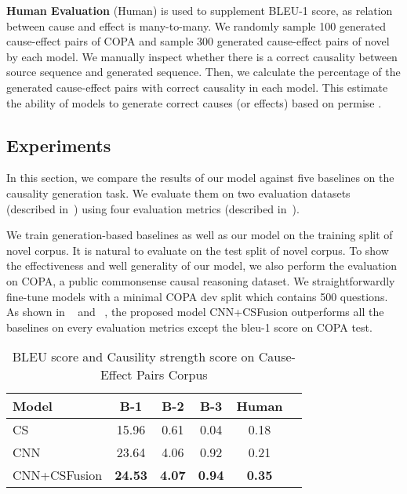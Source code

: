 \textbf{Human Evaluation} (Human) is used to supplement
BLEU-1 score, as relation between cause and effect is many-to-many.
We randomly sample 100 generated cause-effect pairs of COPA
and sample 300 generated cause-effect pairs of novel
by each model.
We manually inspect whether there is a correct causality between source sequence
and generated sequence.
Then, we calculate the percentage of the generated 
cause-effect pairs with correct causality in each model.
This estimate the 
ability of models to generate correct causes (or effects) based on permise .

\subsection{Experiments}
\label{sec:exp}
In this section, we compare the results of our model
against five baselines on the causality generation task.
We evaluate them on two evaluation datasets (described in~) using four evaluation metrics
(described in~).

We train generation-based baselines as well as our model
on the training split of novel corpus.
It is natural to evaluate on the test split of novel corpus.
To show the effectiveness and well generality of our model, we also perform the evaluation 
on COPA, a public commonsense causal reasoning dataset.
We straightforwardly fine-tune models with a minimal COPA dev split which contains 500 questions.
As shown in ~ and ~, 
the proposed model CNN+CSFusion outperforms 
all the baselines on every evaluation metrics
except the bleu-1 score on COPA test.

\begin{table}[th]
	\centering
	\begin{tabular}{|l|c|c|c|c|c|}
		\hline
		Model &   B-1  & B-2 & B-3 & Human \\
		\hline
		CS  & 15.96 & 0.61 & 0.04 & 0.18 \\
		CNN & 23.64 & 4.06 & 0.92 & 0.21 \\
		\hline
		CNN+CSFusion & \bf 24.53 & \bf 4.07 & \bf 0.94 & \bf 0.35 \\
		\hline
	\end{tabular}
	\caption{BLEU score and Causility strength score on Cause-Effect Pairs Corpus}
	\label{tab:novel}
\end{table}


